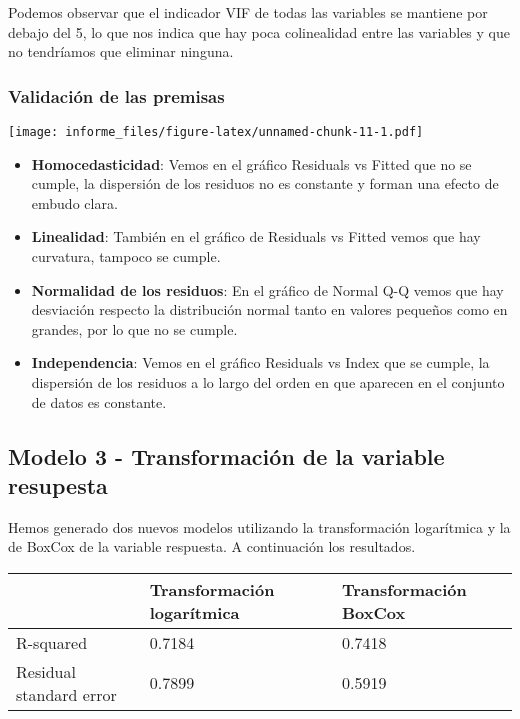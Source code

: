 \documentclass[
]{article}
\providecommand{\tightlist}{%
  \setlength{\itemsep}{0pt}\setlength{\parskip}{0pt}}
\begin{document}
Podemos observar que el indicador VIF de todas las variables se mantiene
por debajo del 5, lo que nos indica que hay poca colinealidad entre las
variables y que no tendríamos que eliminar ninguna.

\hypertarget{validaciuxf3n-de-las-premisas}{%
\subsubsection{Validación de las
premisas}\label{validaciuxf3n-de-las-premisas}}

\texttt{[image: informe\_files/figure-latex/unnamed-chunk-11-1.pdf]}

\begin{itemize}
\tightlist
\item
  \textbf{Homocedasticidad}: Vemos en el gráfico Residuals vs Fitted que
  no se cumple, la dispersión de los residuos no es constante y forman
  una efecto de embudo clara.
\item
  \textbf{Linealidad}: También en el gráfico de Residuals vs Fitted
  vemos que hay curvatura, tampoco se cumple.
\item
  \textbf{Normalidad de los residuos}: En el gráfico de Normal Q-Q vemos
  que hay desviación respecto la distribución normal tanto en valores
  pequeños como en grandes, por lo que no se cumple.
\item
  \textbf{Independencia}: Vemos en el gráfico Residuals vs Index que se
  cumple, la dispersión de los residuos a lo largo del orden en que
  aparecen en el conjunto de datos es constante.
\end{itemize}

\hypertarget{modelo-3---transformaciuxf3n-de-la-variable-resupesta}{%
\subsection{Modelo 3 - Transformación de la variable
resupesta}\label{modelo-3---transformaciuxf3n-de-la-variable-resupesta}}

Hemos generado dos nuevos modelos utilizando la transformación
logarítmica y la de BoxCox de la variable respuesta. A continuación los
resultados.

\begin{longtable}[]{@{}lll@{}}
\toprule
& Transformación logarítmica & Transformación BoxCox\tabularnewline
\midrule
\endhead
R-squared & 0.7184 & 0.7418\tabularnewline
Residual standard error & 0.7899 & 0.5919\tabularnewline
\bottomrule
\end{longtable}
\end{document}
